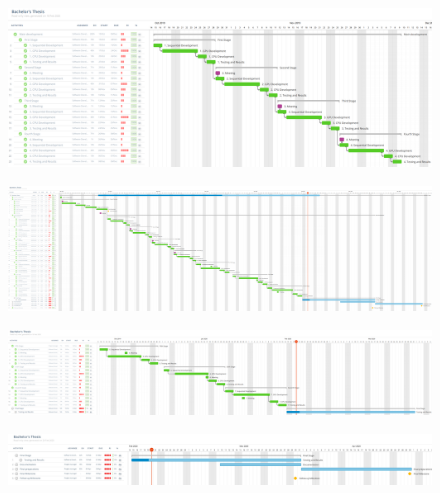 \documentclass[titlepage,12pt]{report}
\begin{document}
\begin{appendices}
\begin{figure}[H]
	\centering
  	\includegraphics[scale=0.25]{media/gantt_dev_esp.png}
  	\label{gantt_2}
\end{figure}

\begin{figure}[H]
	\centering
	\includegraphics[scale=0.30]{media/final_gantt_eng.png}
	\label{gantt_eng}
\end{figure}

\begin{figure}[H]
	\centering
  	\includegraphics[scale=0.25]{media/gantt_dev_eng_new.png}
  	\label{gantt_3}
\end{figure}

\begin{figure}[H]
	\centering
  	\includegraphics[scale=0.25]{media/gantt_final_eng.png}
  	\label{gantt_4}
\end{figure}

\useportrait


\end{appendices}
\end{document}
